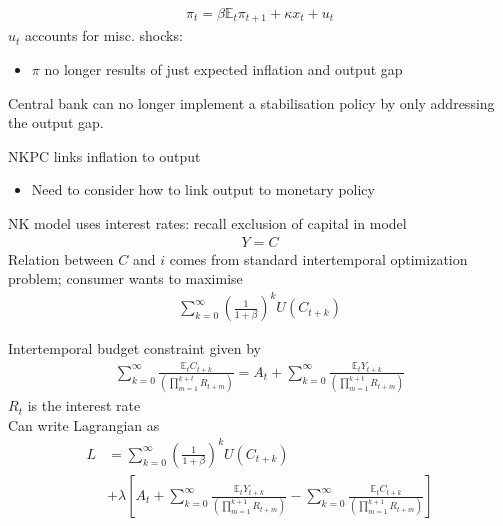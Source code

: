 \documentclass{beamer}
\begin{document}
\begin{frame}
  \begin{align}
  \pi_t=\beta \mathbb{E}_t \pi_{t+1} + \kappa x_t + u_t
\end{align} 
 $u_t$ accounts for misc. shocks:
 \begin{itemize}
   \item $\pi$ no longer results of just expected inflation and output gap
 \end{itemize}
 \medskip
 Central bank can no longer implement a stabilisation policy by only addressing the output gap. 
\end{frame}

\begin{frame}
  NKPC links inflation to output
  \begin{itemize}
    \item Need to consider how to link output to monetary policy
  \end{itemize}
  \medskip  
  NK model uses interest rates: recall exclusion of capital in model
  \begin{align}
    Y=C
  \end{align}
   Relation between $C$ and $i$ comes from standard intertemporal optimization problem; consumer wants to maximise
\begin{align}  
 \sum_{k=0}^{\infty}\left(\frac{1}{1+\beta}\right)^k U(C_{t+k}) 
 \end{align}  
\end{frame}

\begin{frame}
  Intertemporal budget constraint given by  
\begin{align}
  \sum_{k=0}^{\infty} \frac{\mathbb{E}_t C_{t+k}}{\left(\prod_{m=1}^{k+t}R_{t+m} \right)} =
   A_t +   \sum_{k=0}^{\infty} \frac{\mathbb{E}_t Y_{t+k}}{\left(\prod_{m=1}^{k+t}R_{t+m} \right)}
\end{align}
$R_t$ is the interest rate\\
Can write Lagrangian as
\begin{align}
  L &= \sum_{k=0}^{\infty} \left(\frac{1}{1+\beta} \right)^k U(C_{t+k}) \\ \nonumber
  &+ \lambda \left[A_t + \sum_{k=0}^{\infty} \frac{\mathbb{E}_t Y_{t+k}}{\left( \prod_{m=1}^{k+1} R_{t+m} \right)} -
  \sum_{k=0}^{\infty} \frac{\mathbb{E}_t C_{t+k}}{\left( \prod_{m=1}^{k+1} R_{t+m} \right)} \right ]
\end{align}
\end{frame}
\end{document}
